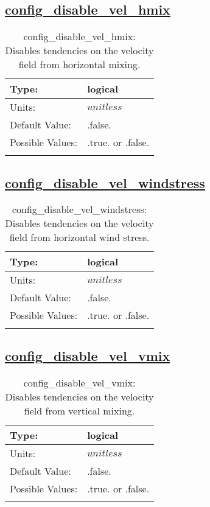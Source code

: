 \subsection[config\_disable\_vel\_hmix]{\hyperref[sec:nm_tab_debug]{config\_disable\_vel\_hmix}}
\label{subsec:nm_sec_config_disable_vel_hmix}
\begin{center}
\begin{longtable}{| p{2.0in} | p{4.0in} |}
    \hline
    Type: & logical \\
    \hline
    Units: & $unitless$ \\
    \hline
    Default Value: & .false. \\
    \hline
    Possible Values: & .true. or .false. \\
    \hline
    \caption{config\_disable\_vel\_hmix: Disables tendencies on the velocity field from horizontal mixing.}
\end{longtable}
\end{center}
\subsection[config\_disable\_vel\_windstress]{\hyperref[sec:nm_tab_debug]{config\_disable\_vel\_windstress}}
\label{subsec:nm_sec_config_disable_vel_windstress}
\begin{center}
\begin{longtable}{| p{2.0in} | p{4.0in} |}
    \hline
    Type: & logical \\
    \hline
    Units: & $unitless$ \\
    \hline
    Default Value: & .false. \\
    \hline
    Possible Values: & .true. or .false. \\
    \hline
    \caption{config\_disable\_vel\_windstress: Disables tendencies on the velocity field from horizontal wind stress.}
\end{longtable}
\end{center}
\subsection[config\_disable\_vel\_vmix]{\hyperref[sec:nm_tab_debug]{config\_disable\_vel\_vmix}}
\label{subsec:nm_sec_config_disable_vel_vmix}
\begin{center}
\begin{longtable}{| p{2.0in} | p{4.0in} |}
    \hline
    Type: & logical \\
    \hline
    Units: & $unitless$ \\
    \hline
    Default Value: & .false. \\
    \hline
    Possible Values: & .true. or .false. \\
    \hline
    \caption{config\_disable\_vel\_vmix: Disables tendencies on the velocity field from vertical mixing.}
\end{longtable}
\end{center}
